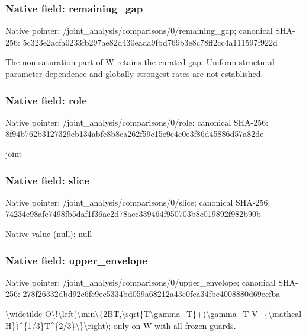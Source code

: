 \documentclass[10pt,a4paper]{article}
\begin{document}
\subsubsection{Native field: remaining\_\allowbreak{}gap}
Native pointer: /joint\_\allowbreak{}analysis/comparisons/0/remaining\_\allowbreak{}gap; canonical SHA-256: 5c323e2acfa0233fb297ae82d430eada9fbd769b3e8c78ff2cc4a111597f922d

\begingroup\raggedright\sloppy The non-saturation part of W retains the curated gap. Uniform structural-parameter dependence and globally strongest rates are not established.\par\endgroup

\subsubsection{Native field: role}
Native pointer: /joint\_\allowbreak{}analysis/comparisons/0/role; canonical SHA-256: 8f94b762b3127329eb134abfe8b8ca262f59c15e9c4e0e3f86d45886d57a82de

\begingroup\raggedright\sloppy joint\par\endgroup

\subsubsection{Native field: slice}
Native pointer: /joint\_\allowbreak{}analysis/comparisons/0/slice; canonical SHA-256: 74234e98afe7498fb5daf1f36ac2d78acc339464f950703b8c019892f982b90b

Native value (null): null

\subsubsection{Native field: upper\_\allowbreak{}envelope}
Native pointer: /joint\_\allowbreak{}analysis/comparisons/0/upper\_\allowbreak{}envelope; canonical SHA-256: 278f26332dbd92c6fc9ec5334bd059a68212a43c0fca34fbe4008880d69ecfba

\begingroup\raggedright\sloppy \textbackslash{}widetilde O\textbackslash{}!\textbackslash{}left(\textbackslash{}min\textbackslash{}\{2BT,\allowbreak{}\textbackslash{}sqrt\{T\textbackslash{}gamma\_\allowbreak{}T\}+(\textbackslash{}gamma\_\allowbreak{}T V\_\allowbreak{}\{\textbackslash{}mathcal H\})\textasciicircum{}\{1/\allowbreak{}3\}T\textasciicircum{}\{2/\allowbreak{}3\}\textbackslash{}\}\textbackslash{}right);\allowbreak{} only on W with all frozen guards.\par\endgroup
\end{document}
